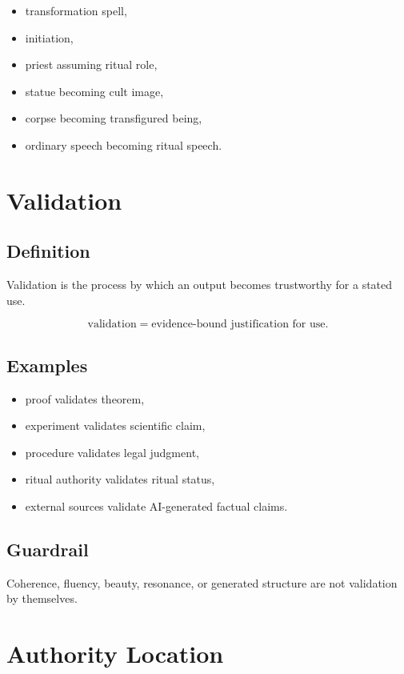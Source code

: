 \documentclass[11pt]{book}
\begin{document}
\begin{itemize}
    \item transformation spell,
    \item initiation,
    \item priest assuming ritual role,
    \item statue becoming cult image,
    \item corpse becoming transfigured being,
    \item ordinary speech becoming ritual speech.
\end{itemize}

\section{Validation}

\subsection*{Definition}

Validation is the process by which an output becomes trustworthy for a stated use.

\[
\text{validation} = \text{evidence-bound justification for use}.
\]

\subsection*{Examples}

\begin{itemize}
    \item proof validates theorem,
    \item experiment validates scientific claim,
    \item procedure validates legal judgment,
    \item ritual authority validates ritual status,
    \item external sources validate AI-generated factual claims.
\end{itemize}

\subsection*{Guardrail}

Coherence, fluency, beauty, resonance, or generated structure are not validation by themselves.

\section{Authority Location}
\end{document}
